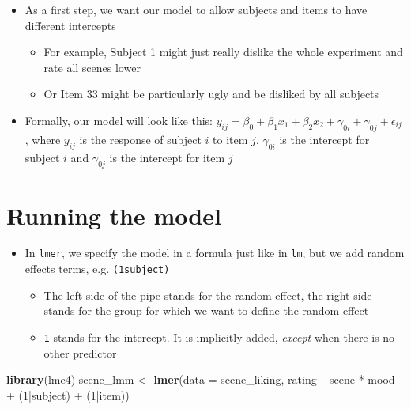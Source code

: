 \documentclass[]{article}
\newenvironment{Shaded}{}{}
\newcommand{\KeywordTok}[1]{\textcolor[rgb]{0.00,0.44,0.13}{\textbf{{#1}}}}
\newcommand{\DataTypeTok}[1]{\textcolor[rgb]{0.56,0.13,0.00}{{#1}}}
\newcommand{\DecValTok}[1]{\textcolor[rgb]{0.25,0.63,0.44}{{#1}}}
\newcommand{\StringTok}[1]{\textcolor[rgb]{0.25,0.44,0.63}{{#1}}}
\newcommand{\NormalTok}[1]{{#1}}
\begin{document}
\begin{itemize}
\itemsep1pt\parskip0pt
\item
  As a first step, we want our model to allow subjects and items to have
  different intercepts

  \begin{itemize}
  \itemsep1pt\parskip0pt
  \item
    For example, Subject 1 might just really dislike the whole
    experiment and rate all scenes lower
  \item
    Or Item 33 might be particularly ugly and be disliked by all
    subjects
  \end{itemize}
\item
  Formally, our model will look like this:
  $y_{ij} = \beta_0 + \beta_1 x_{1} + \beta_2 x_{2} + \gamma_{0i} + \gamma_{0j} + \epsilon_{ij}$,
  where $y_{ij}$ is the response of subject $i$ to item $j$,
  $\gamma_{0i}$ is the intercept for subject $i$ and $\gamma_{0j}$ is
  the intercept for item $j$
\end{itemize}

\section{Running the model}\label{running-the-model}

\begin{itemize}
\itemsep1pt\parskip0pt
\item
  In \texttt{lmer}, we specify the model in a formula just like in
  \texttt{lm}, but we add random effects terms, e.g.
  \texttt{(1\textbar{}subject)}

  \begin{itemize}
  \itemsep1pt\parskip0pt
  \item
    The left side of the pipe stands for the random effect, the right
    side stands for the group for which we want to define the random
    effect
  \item
    \texttt{1} stands for the intercept. It is implicitly added,
    \emph{except} when there is no other predictor
  \end{itemize}
\end{itemize}

\begin{Shaded}
\begin{Highlighting}[]
\KeywordTok{library}\NormalTok{(lme4)}
\NormalTok{scene_lmm <-}\StringTok{ }\KeywordTok{lmer}\NormalTok{(}\DataTypeTok{data =} \NormalTok{scene_liking, rating ~}\StringTok{ }\NormalTok{scene *}\StringTok{ }\NormalTok{mood +}\StringTok{ }\NormalTok{(}\DecValTok{1}\NormalTok{|subject) +}\StringTok{ }\NormalTok{(}\DecValTok{1}\NormalTok{|item))}
\end{Highlighting}
\end{Shaded}
\end{document}
